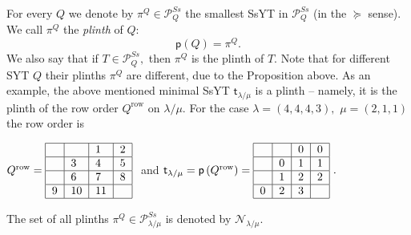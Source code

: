 \documentclass[12pt]{article}%
\begin{document}
For every $Q$ we denote by $\pi^{Q}\in\mathcal{P}_{Q}^{Ss}$ the smallest SsYT
in $\mathcal{P}_{Q}^{Ss}$ (in the $\succeq$ sense). We call $\pi^{Q}$ the
\textit{plinth} of $Q:$%
\[
\mathsf{p}\left(  Q\right)  =\pi^{Q}.
\]
We also say that if $T\in\mathcal{P}_{Q}^{Ss},$ then $\pi^{Q}$ is the plinth
of $T.$ Note that for different SYT $Q$ their plinths $\pi^{Q}$ are different,
due to the Proposition above. As an example, the above mentioned minimal SsYT
$\mathsf{t}_{\lambda/\mu}$ is a plinth -- namely, it is the plinth of the row
order $Q^{\operatorname{row}}$ on $\lambda/\mu.$ For the case $\lambda=\left(
4,4,4,3\right)  ,$ $\mu=\left(  2,1,1\right)  $ the row order is

$Q^{\operatorname{row}}=%
\begin{tabular}
[c]{|l|l|l|l|}\hline
&  & 1 & 2\\\hline
& 3 & 4 & 5\\\hline
& 6 & 7 & 8\\\hline
9 & 10 & 11 & \\\hline
\end{tabular}
\ $ and $\mathsf{t}_{\lambda/\mu}=\mathsf{p}\left(  Q^{\operatorname{row}%
}\right)  =%
\begin{tabular}
[c]{|l|l|l|l|}\hline
&  & 0 & 0\\\hline
& 0 & 1 & 1\\\hline
& 1 & 2 & 2\\\hline
0 & 2 & 3 & \\\hline
\end{tabular}
\ .$

The set of all plinths $\pi^{Q}\in\mathcal{P}_{\lambda/\mu}^{Ss}$ is denoted
by $\mathcal{N}_{\lambda/\mu}.$
\end{document}
